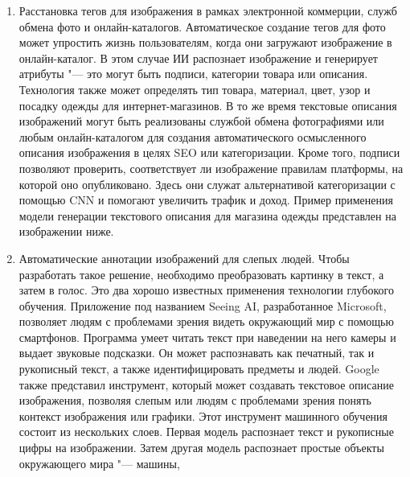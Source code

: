 \documentclass[bachelor, och, coursework]{SCWorks}
\begin{document}
        \begin{enumerate}
            \item 
                Расстановка тегов для изображения в рамках электронной
                коммерции, служб обмена фото и онлайн-каталогов. Автоматическое
                создание тегов для фото может упростить жизнь пользователям,
                когда они загружают изображение в онлайн-каталог. В этом случае
                ИИ распознает изображение и генерирует атрибуты "--- это могут
                быть подписи, категории товара или описания. Технология также
                может определять тип товара, материал, цвет, узор и посадку
                одежды для интернет-магазинов. В то же время текстовые описания
                изображений могут быть реализованы службой обмена фотографиями
                или любым онлайн-каталогом для создания автоматического
                осмысленного описания изображения в целях SEO или категоризации.
                Кроме того, подписи позволяют проверить, соответствует ли
                изображение правилам платформы, на которой оно опубликовано.
                Здесь они служат альтернативой категоризации с помощью CNN и
                помогают увеличить трафик и доход. Пример применения модели
                генерации текстового описания для магазина одежды представлен на
                изображении ниже.
            \item
                Автоматические аннотации изображений для слепых людей. Чтобы
                разработать такое решение, необходимо преобразовать картинку в
                текст, а затем в голос. Это два хорошо известных применения
                технологии глубокого обучения. Приложение под названием Seeing
                AI, разработанное Microsoft, позволяет людям с проблемами зрения
                видеть окружающий мир с помощью смартфонов. Программа умеет
                читать текст при наведении на него камеры и выдает звуковые
                подсказки. Он может распознавать как печатный, так и рукописный
                текст, а также идентифицировать предметы и людей. Google также
                представил инструмент, который может создавать текстовое
                описание изображения, позволяя слепым или людям с проблемами
                зрения понять контекст изображения или графики. Этот инструмент
                машинного обучения состоит из нескольких слоев. Первая модель
                распознает текст и рукописные цифры на изображении. Затем другая
                модель распознает простые объекты окружающего мира "--- машины,

\end{enumerate}
\end{document}
